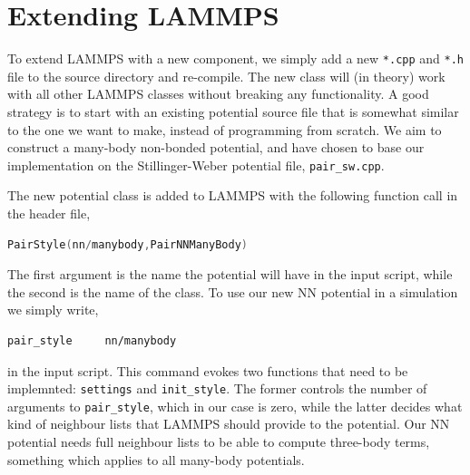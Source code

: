 \documentclass[twoside,english]{uiofysmaster}
\begin{document}
\section{Extending LAMMPS} \label{sec:extendingLammps}
To extend LAMMPS with a new component, we 
simply add a new \texttt{*.cpp} and \texttt{*.h} file to the 
source directory and re-compile. The new class
will (in theory) work with all other LAMMPS 
classes without breaking any functionality. 
A good strategy is to start with an existing potential
source file that is somewhat similar to the one 
we want to make, instead of programming from scratch.
We aim to construct a many-body non-bonded potential, and 
have chosen to base our implementation on the 
Stillinger-Weber potential file, \texttt{pair\_sw.cpp}.

The new potential class is added to LAMMPS with the following function call in the header file,
\begin{lstlisting}[language=c++]
 PairStyle(nn/manybody,PairNNManyBody)
\end{lstlisting}
The first argument is the name the potential will have in the input script, while 
the second is the name of the class. 
To use our new NN potential in a simulation we simply write,
\begin{lstlisting}[style=lammps]
 pair_style 	nn/manybody
\end{lstlisting}
in the input script. This command evokes two functions that need to be implemnted: \texttt{settings}
and \texttt{init\_style}. The former controls the number of arguments to 
\texttt{pair\_style}, which in our case is zero, while the latter
decides what kind of neighbour lists that LAMMPS should provide to the potential. Our NN potential needs 
full neighbour lists to be able to compute three-body terms, something which applies to all many-body potentials. 
\end{document}

